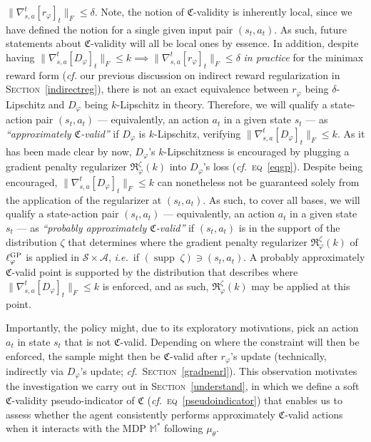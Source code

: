 $\lVert \nabla_{s,a}^t[r_\varphi]_t \rVert _F \leq \delta$.
Note, the notion of $\mathfrak{C}$-validity is inherently local,
since we have defined the notion for a single given input pair $(s_t, a_t)$.
As such, future statements about $\mathfrak{C}$-validity will all be local ones by essence.
In addition,
despite having $\lVert \nabla_{s,a}^t[D_\varphi]_t \rVert _F \leq k
\implies \lVert \nabla_{s,a}^t[r_\varphi]_t \rVert _F \leq \delta$
\emph{in practice} for the minimax reward form
(\textit{cf.} our previous discussion on indirect reward regularization in \textsc{Section}~\ref{indirectreg}),
there is not an exact equivalence between $r_\varphi$ being $\delta$-Lipschitz
and $D_\varphi$ being $k$-Lipschitz in theory.
Therefore, we will qualify a state-action pair $(s_t, a_t)$
--- equivalently, an action $a_t$ in a given state $s_t$ ---
as \textit{``approximately $\mathfrak{C}$-valid''} if
$D_\varphi$ is $k$-Lipschitz, verifying
$\lVert \nabla_{s,a}^t[D_\varphi]_t \rVert _F \leq k$.
As it has been made clear by now, $D_\varphi$'s $k$-Lipschitzness is encouraged by
plugging a gradient penalty regularizer $\mathfrak{R}_\varphi^\zeta (k)$ into $D_\varphi$'s loss
(\textit{cf.}~\textsc{eq}~\ref{eqgp}).
Despite being encouraged, $\lVert \nabla_{s,a}^t[D_\varphi]_t \rVert _F \leq k$ can nonetheless not be guaranteed
solely from the application of the regularizer at $(s_t, a_t)$.
As such, to cover all bases,
we will qualify a state-action pair $(s_t, a_t)$
--- equivalently, an action $a_t$ in a given state $s_t$ ---
as \textit{``probably approximately $\mathfrak{C}$-valid''} if
$(s_t, a_t)$ is in the support of the distribution $\zeta$ that determines where the
gradient penalty regularizer $\mathfrak{R}_\varphi^\zeta (k)$ of $\ell_\varphi^\textsc{GP}$ is applied
in $\mathcal{S} \times \mathcal{A}$,
\textit{i.e.}~if $(\operatorname{supp} \; \zeta) \ni (s_t, a_t)$.
A probably approximately $\mathfrak{C}$-valid point is supported by the distribution
that describes where $\lVert \nabla_{s,a}^t[D_\varphi]_t \rVert _F \leq k$ is enforced, and as such,
$\mathfrak{R}_\varphi^\zeta (k)$ may be applied at this point.

Importantly, the policy might, due to its exploratory motivations,
pick an action $a_t$ in state $s_t$ that is not $\mathfrak{C}$-valid.
Depending on where the constraint will then be enforced, the sample might then
be $\mathfrak{C}$-valid after $r_\varphi$'s update
(technically, indirectly via $D_\varphi$'s update; \textit{cf.}~\textsc{Section}~\ref{gradpenrl}).
This observation motivates the investigation we carry out in \textsc{Section}~\ref{understand},
in which we define a soft $\mathfrak{C}$-validity pseudo-indicator of $\mathfrak{C}$
(\textit{cf.}~\textsc{eq}~\ref{pseudoindicator})
that enables us to assess whether the
agent consistently performs approximately $\mathfrak{C}$-valid actions
when it interacts with the MDP $\mathbb{M}^*$ following $\mu_\theta$.

